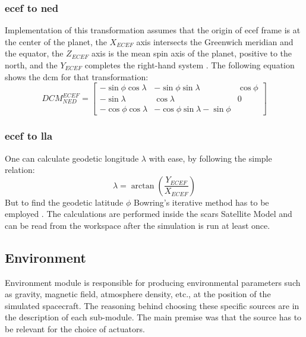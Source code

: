     \subsubsection{\ac{ecef} to \ac{ned}}
       Implementation of this transformation assumes that the origin of \ac{ecef} frame is at the center of the planet, the $X_{ECEF}$ axis intersects the Greenwich meridian and the equator, the $Z_{ECEF}$ axis is the mean spin axis of the planet, positive to the north, and the $Y_{ECEF}$ completes the right-hand system \cite{aboutareospace}. The following equation shows the \ac{dcm} for that transformation:
       \begin{equation}
           DCM^{ECEF}_{NED} = \begin{bmatrix} -\sin\phi\cos\lambda & -\sin\phi\sin\lambda & \cos\phi\\
               -\sin\lambda & \cos\lambda & 0 \\
               -\cos\phi\cos\lambda & -\cos\phi\sin\lambda -\sin\phi \end{bmatrix}
       \end{equation}

    \subsubsection{\ac{ecef} to \ac{lla}}
        One can calculate geodetic longitude $\lambda$ with ease, by following the simple relation:
        \begin{equation}
            \lambda = \arctan(\frac{Y_{ECEF}}{X_{ECEF}})
        \end{equation}
        But to find the geodetic latitude $\phi$ Bowring's iterative method has to be employed \cite{gerdan1999transforming}. The calculations are performed inside the \ac{scars} Satellite Model and can be read from the workspace after the simulation is run at least once.


\subsection{Environment}
    Environment module is responsible for producing environmental parameters such as gravity, magnetic field, atmosphere density, etc., at the position of the simulated spacecraft. The reasoning behind choosing these specific sources are in the description of each sub-module. The main premise was that the source has to be relevant for the choice of actuators.

